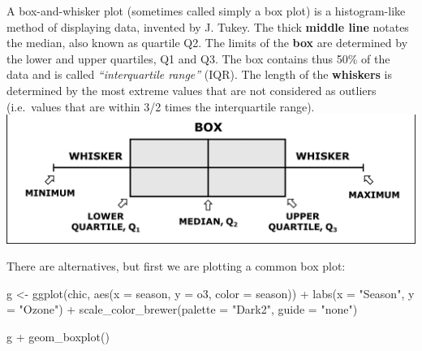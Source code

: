 \documentclass[
  letterpaper,
]{scrbook}
\newenvironment{Shaded}{\begin{snugshade}}{\end{snugshade}}
\newcommand{\AttributeTok}[1]{\textcolor[rgb]{0.40,0.45,0.13}{#1}}
\newcommand{\FunctionTok}[1]{\textcolor[rgb]{0.28,0.35,0.67}{#1}}
\newcommand{\NormalTok}[1]{\textcolor[rgb]{0.00,0.23,0.31}{#1}}
\newcommand{\OtherTok}[1]{\textcolor[rgb]{0.00,0.23,0.31}{#1}}
\newcommand{\SpecialCharTok}[1]{\textcolor[rgb]{0.37,0.37,0.37}{#1}}
\newcommand{\StringTok}[1]{\textcolor[rgb]{0.13,0.47,0.30}{#1}}
\begin{document}
\begin{tcolorbox}[enhanced jigsaw, toprule=.15mm, bottomtitle=1mm, coltitle=black, breakable, colbacktitle=quarto-callout-tip-color!10!white, opacityback=0, toptitle=1mm, colframe=quarto-callout-tip-color-frame, titlerule=0mm, title=\textcolor{quarto-callout-tip-color}{\faLightbulb}\hspace{0.5em}{Recall: Box and Whiskers Plot}, bottomrule=.15mm, arc=.35mm, opacitybacktitle=0.6, leftrule=.75mm, left=2mm, rightrule=.15mm, colback=white]

A box-and-whisker plot (sometimes called simply a box plot) is a
histogram-like method of displaying data, invented by J. Tukey. The
thick \textbf{middle line} notates the median, also known as quartile
Q2. The limits of the \textbf{box} are determined by the lower and upper
quartiles, Q1 and Q3. The box contains thus 50\% of the data and is
called \emph{``interquartile range''} (IQR). The length of the
\textbf{whiskers} is determined by the most extreme values that are not
considered as outliers (i.e.~values that are within 3/2 times the
interquartile range). \includegraphics{extra_pics/boxplot.png}

\end{tcolorbox}

There are alternatives, but first we are plotting a common box plot:

\begin{Shaded}
\begin{Highlighting}[]
\NormalTok{g }\OtherTok{\textless{}{-}}
  \FunctionTok{ggplot}\NormalTok{(chic, }\FunctionTok{aes}\NormalTok{(}\AttributeTok{x =}\NormalTok{ season, }\AttributeTok{y =}\NormalTok{ o3,}
                   \AttributeTok{color =}\NormalTok{ season)) }\SpecialCharTok{+}
    \FunctionTok{labs}\NormalTok{(}\AttributeTok{x =} \StringTok{"Season"}\NormalTok{, }\AttributeTok{y =} \StringTok{"Ozone"}\NormalTok{) }\SpecialCharTok{+}
    \FunctionTok{scale\_color\_brewer}\NormalTok{(}\AttributeTok{palette =} \StringTok{"Dark2"}\NormalTok{, }\AttributeTok{guide =} \StringTok{"none"}\NormalTok{)}

\NormalTok{g }\SpecialCharTok{+} \FunctionTok{geom\_boxplot}\NormalTok{()}
\end{Highlighting}
\end{Shaded}
\end{document}
